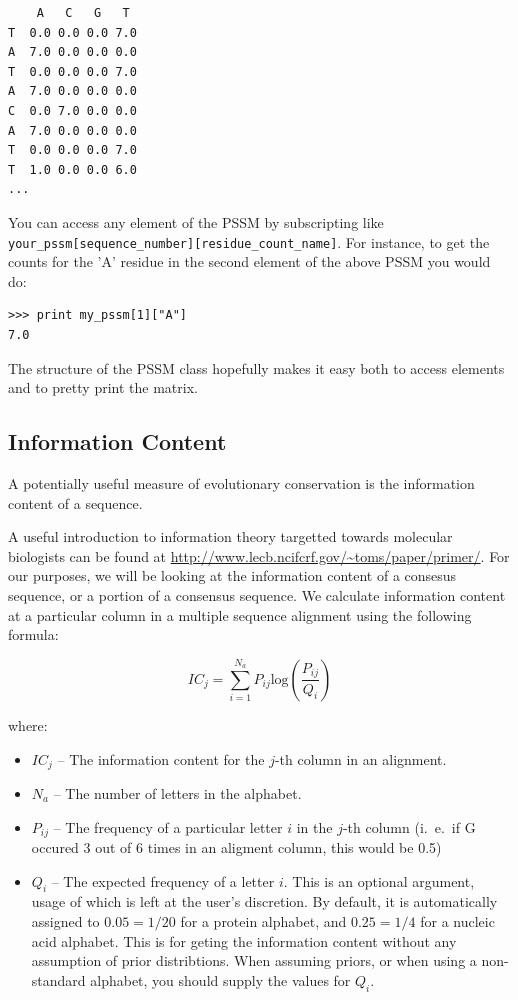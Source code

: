 \documentclass{report}
\begin{document}
\begin{verbatim}
    A   C   G   T
T  0.0 0.0 0.0 7.0
A  7.0 0.0 0.0 0.0
T  0.0 0.0 0.0 7.0
A  7.0 0.0 0.0 0.0
C  0.0 7.0 0.0 0.0
A  7.0 0.0 0.0 0.0
T  0.0 0.0 0.0 7.0
T  1.0 0.0 0.0 6.0
...
\end{verbatim}

You can access any element of the PSSM by subscripting like \verb|your_pssm[sequence_number][residue_count_name]|. For instance, to get the counts for the 'A' residue in the second element of the above PSSM you would do:

\begin{verbatim}
>>> print my_pssm[1]["A"]
7.0
\end{verbatim}

The structure of the PSSM class hopefully makes it easy both to access elements and to pretty print the matrix.

\subsection{Information Content}
\label{sec:getting_info_content}

A potentially useful measure of evolutionary conservation is the information content of a sequence.

A useful introduction to information theory targetted towards molecular biologists can be found at \url{http://www.lecb.ncifcrf.gov/~toms/paper/primer/}. For our purposes, we will be looking at the information content of a consesus sequence, or a portion of a consensus sequence. We calculate information content at a particular column in a multiple sequence alignment using the following formula:

\begin{displaymath}
IC_{j} = \sum_{i=1}^{N_{a}} P_{ij} \mathrm{log}\left(\frac{P_{ij}}{Q_{i}}\right)
\end{displaymath}

\noindent where:

\begin{itemize}
  \item $IC_{j}$ -- The information content for the $j$-th column in an alignment.
  \item $N_{a}$ -- The number of letters in the alphabet.
  \item $P_{ij}$ -- The frequency of a particular letter $i$ in the $j$-th column (i.~e.~if G occured 3 out of 6 times in an aligment column, this would be 0.5)
  \item $Q_{i}$ --  The expected frequency of a letter $i$. This is an
  optional argument, usage of which is left at the user's
  discretion. By default, it is automatically assigned to $0.05 = 1/20$ for a
  protein alphabet, and $0.25 = 1/4$ for a nucleic acid alphabet. This is for
  geting the information content without any assumption of prior
  distribtions. When assuming priors, or when using a non-standard
  alphabet, you should supply the values for $Q_{i}$.
\end{itemize}
\end{document}
